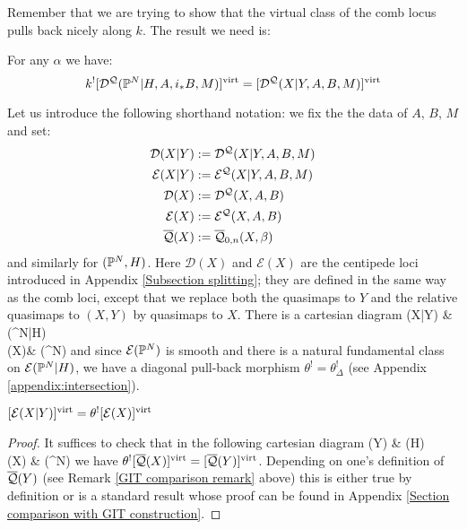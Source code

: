 Remember that we are trying to show that the virtual class of the comb locus pulls back nicely along $k$. The result we need is:
\begin{lem} \label{Comb loci pull back} For any $\alpha$ we have:
\begin{equation*} k^! [\mathcal D^\mathcal{Q}(\mathbb P^N|H,A,i_*B,M)]^{\operatorname{virt}} = [\mathcal D^\mathcal{Q}(X|Y,A,B,M)]^{\operatorname{virt}} \end{equation*} \end{lem}
Let us introduce the following shorthand notation: we fix the the data of $A$, $B$, $M$ and set:
\begin{align*}
\mathcal{D}(X|Y) & := \mathcal D^{\mathcal{Q}}(X|Y,A,B,M) \\
\mathcal{E}(X|Y) & := \mathcal E^{\mathcal{Q}}(X|Y,A,B,M) \\
\mathcal{D}(X) & := \mathcal{D}^{\mathcal{Q}}(X,A,B) \\
\mathcal{E}(X) & := \mathcal{E}^{\mathcal{Q}}(X,A,B) \\
\overline{\mathcal{Q}}(X) & :=\overline{\mathcal Q}_{0,n}(X,\beta)
\end{align*}
and similarly for $(\mathbb P^N,H)$. Here $\mathcal{D}(X)$ and $\mathcal{E}(X)$ are the centipede loci introduced in Appendix \ref{Subsection splitting}; they are defined in the same way as the comb loci, except that we replace both the quasimaps to $Y$ and the relative quasimaps to $(X,Y)$ by quasimaps to $X$. There is a cartesian diagram
\bcd
{}(X|Y) \ar[d]\ar[r] & (\PP^N|H)\ar[d,"\theta"] \\
(X)\ar[r] & (\PP^N)
\ecd
and since $\mathcal{E}(\mathbb P^N)$ is smooth and there is a natural fundamental class on $\mathcal{E}(\mathbb P^N|H)$, we have a diagonal pull-back morphism $\theta^! = \theta_{\Delta}^!$ (see Appendix \ref{appendix:intersection}).
\begin{lemma}\label{theta-pull} $[\mathcal{E}(X|Y)]^{\operatorname{virt}}=\theta^![\mathcal{E}(X)]^{\operatorname{virt}}$ \end{lemma}
\begin{proof}
It suffices to check that in the following cartesian diagram
\bcd
{}(Y) \ar[r] \ar[d]  & (H) \ar[d,"\theta"] \\
(X) \ar[r] & (\PP^N)
\ecd
we have $\theta^! [\overline{\mathcal{Q}}(X)]^{\operatorname{virt}} = [\overline{\mathcal{Q}}(Y)]^{\operatorname{virt}}$. Depending on one's definition of $\overline{\mathcal{Q}}(Y)$ (see Remark \ref{GIT comparison remark} above) this is either true by definition or is a standard result whose proof can be found in Appendix \ref{Section comparison with GIT construction}.
\end{proof}

